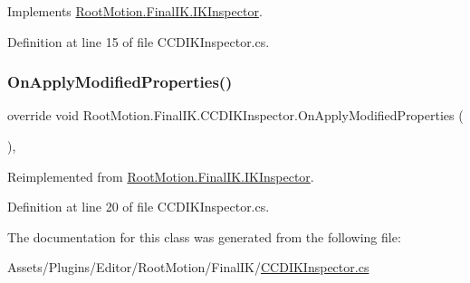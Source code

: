Implements \mbox{\hyperlink{class_root_motion_1_1_final_i_k_1_1_i_k_inspector_a4c4528d5f5ce9af9e30c049138a5a5ca}{Root\+Motion.\+Final\+I\+K.\+I\+K\+Inspector}}.



Definition at line 15 of file C\+C\+D\+I\+K\+Inspector.\+cs.

\mbox{\label{class_root_motion_1_1_final_i_k_1_1_c_c_d_i_k_inspector_a38d0e00d987c69c86bbb08fddc35336e}} 
\subsubsection{\texorpdfstring{On\+Apply\+Modified\+Properties()}{OnApplyModifiedProperties()}}
{\footnotesize\ttfamily override void Root\+Motion.\+Final\+I\+K.\+C\+C\+D\+I\+K\+Inspector.\+On\+Apply\+Modified\+Properties (\begin{DoxyParamCaption}{ }\end{DoxyParamCaption})\hspace{0.3cm}{\ttfamily [protected]}, {\ttfamily [virtual]}}



Reimplemented from \mbox{\hyperlink{class_root_motion_1_1_final_i_k_1_1_i_k_inspector_a2909376aa17c40b7d7577761165d1c67}{Root\+Motion.\+Final\+I\+K.\+I\+K\+Inspector}}.



Definition at line 20 of file C\+C\+D\+I\+K\+Inspector.\+cs.



The documentation for this class was generated from the following file\+:\begin{DoxyCompactItemize}
\item 
Assets/\+Plugins/\+Editor/\+Root\+Motion/\+Final\+I\+K/\mbox{\hyperlink{_c_c_d_i_k_inspector_8cs}{C\+C\+D\+I\+K\+Inspector.\+cs}}\end{DoxyCompactItemize}
